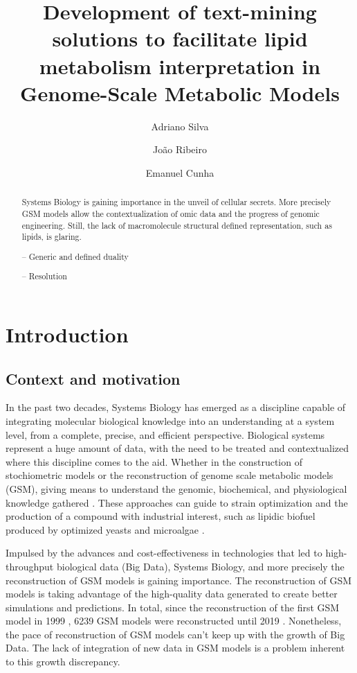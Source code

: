 \documentclass{llncs}
\begin{document}
\pagestyle{myheadings}
\title{Development of text-mining solutions to facilitate lipid metabolism interpretation in Genome-Scale Metabolic Models}

\author{Adriano Silva\and
João Ribeiro\and
Emanuel Cunha}

%
\maketitle              %
%
\begin{abstract}
Systems Biology is gaining importance in the unveil of cellular secrets. More precisely GSM models allow the contextualization of omic data and the progress of genomic engineering.
Still, the lack of macromolecule structural defined representation, such as lipids, is glaring.

-- Generic and defined duality

-- Resolution

\end{abstract}
%
%
%
\section{Introduction}
\subsection{Context and motivation}
In the past two decades, Systems Biology has emerged as a discipline capable of integrating molecular biological knowledge into an understanding at a system level, from a complete, precise, and efficient perspective.
Biological systems represent a huge amount of data, with the need to be treated and contextualized where this discipline comes to the aid.  
Whether in the construction of stochiometric models or the reconstruction of genome scale metabolic models (GSM), giving means to understand the genomic, biochemical, and physiological knowledge gathered \cite{Zou2018,Tavassoly2018}. 
These approaches can guide to strain optimization and the production of a compound with industrial interest, such as lipidic biofuel produced by optimized yeasts and microalgae \cite{Sawangkeaw2013}.

Impulsed by the advances and cost-effectiveness in technologies that led to high-throughput biological data (Big Data), Systems Biology, and more precisely the reconstruction of GSM models is gaining importance.
The reconstruction of GSM models is taking advantage of the high-quality data generated to create better simulations and predictions. 
In total, since the reconstruction of the first GSM model in 1999 \cite{Edwards1999}, 6239 GSM models were reconstructed until 2019 \cite{Gu2019}. 
Nonetheless, the pace of reconstruction of GSM models can't keep up with the growth of Big Data. The lack of integration of new data in GSM models is a problem inherent to this growth discrepancy.
\end{document}
